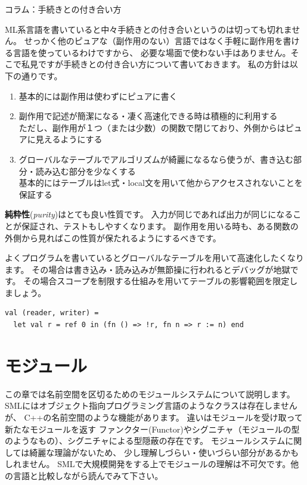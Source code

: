 \documentclass[11pt,a4paper]{article}
\begin{document}
\begin{itembox}[l]{コラム：手続きとの付き合い方}

ML系言語を書いていると中々手続きとの付き合いというのは切っても切れません。
せっかく他のピュアな（副作用のない）言語ではなく手軽に副作用を書ける言語を使っているわけですから、
必要な場面で使わない手はありません。そこで私見ですが手続きとの付き合い方について書いておきます。
私の方針は以下の通りです。

\begin{enumerate}
\item 基本的には副作用は使わずにピュアに書く
\item 副作用で記述が簡潔になる・凄く高速化できる時は積極的に利用する\\
  ただし、副作用が１つ（または少数）の関数で閉じており、外側からはピュアに見えるようにする
\item グローバルなテーブルでアルゴリズムが綺麗になるなら使うが、書き込む部分・読み込む部分を少なくする\\
  基本的にはテーブルはlet式・local文を用いて他からアクセスされないことを保証する
\end{enumerate}

\textbf{純粋性}(\textit{purity})はとても良い性質です。
入力が同じであれば出力が同じになることが保証され、テストもしやすくなります。
副作用を用いる時も、ある関数の外側から見ればこの性質が保たれるようにするべきです。

よくプログラムを書いているとグローバルなテーブルを用いて高速化したくなります。
その場合は書き込み・読み込みが無節操に行われるとデバッグが地獄です。
その場合スコープを制限する仕組みを用いてテーブルの影響範囲を限定しましょう。

\begin{lstlisting}[caption=let式でリファレンスが他からアクセスされないことを保証する]
val (reader, writer) =
  let val r = ref 0 in (fn () => !r, fn n => r := n) end
\end{lstlisting}

\end{itembox}

\section{モジュール}

この章では名前空間を区切るためのモジュールシステムについて説明します。
SMLにはオブジェクト指向プログラミング言語のようなクラスは存在しませんが、
C++の名前空間のような機能があります。
違いはモジュールを受け取って新たなモジュールを返す
ファンクター(Functor)やシグニチャ（モジュールの型のようなもの）、シグニチャによる型隠蔽の存在です。
モジュールシステムに関しては綺麗な理論がないため、
少し理解しづらい・使いづらい部分があるかもしれません。
SMLで大規模開発をする上でモジュールの理解は不可欠です。他の言語と比較しながら読んでみて下さい。
\end{document}
